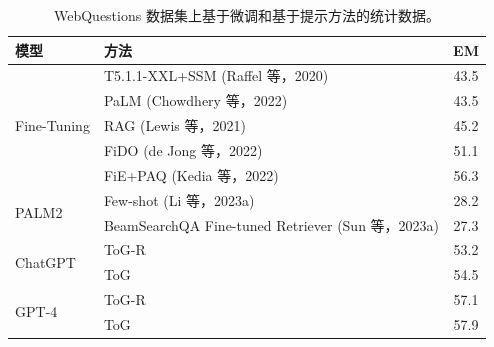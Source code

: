 \documentclass[11pt,UTF8,fontset=fandol]{ctexart}
\begin{document}
\begin{table}[H]\centering
\caption{WebQuestions 数据集上基于微调和基于提示方法的统计数据。}
\label{tab:15}
\small
\begin{tabular}{llc}
\toprule
模型 & 方法 & EM \\
\midrule
\multirow{5}{*}{Fine-Tuning} & T5.1.1-XXL+SSM (Raffel 等，2020) & 43.5 \\
& PaLM (Chowdhery 等，2022) & 43.5 \\
& RAG (Lewis 等，2021) & 45.2 \\
& FiDO (de Jong 等，2022) & 51.1 \\
& FiE+PAQ (Kedia 等，2022) & 56.3 \\
\midrule
\multirow{2}{*}{PALM2} & Few-shot (Li 等，2023a) & 28.2 \\
& BeamSearchQA Fine-tuned Retriever (Sun 等，2023a) & 27.3 \\
\midrule
\multirow{2}{*}{ChatGPT} & ToG-R & 53.2 \\
& ToG & 54.5 \\
\midrule
\multirow{2}{*}{GPT-4} & ToG-R & 57.1 \\
& ToG & 57.9 \\
\bottomrule
\end{tabular}
\end{table}
\end{document}
